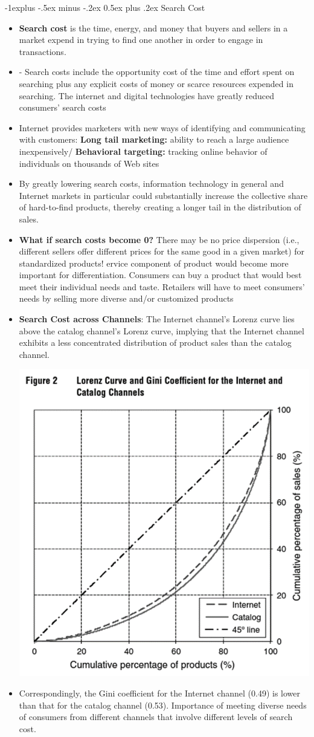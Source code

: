 \documentclass[12pt, landscape]{article}
\makeatletter
\renewcommand{\subsection}{\@startsection{subsection}{2}{0mm}%
                                {-1explus -.5ex minus -.2ex}%
                                {0.5ex plus .2ex}%
                                {\normalfont\normalsize\bfseries}}
\makeatother
\begin{document}
\begin{multicols*}{3}
\subsection{Search Cost }
\begin{itemize}
\item \textbf{Search cost} is the time, energy, and money that buyers and sellers in a market expend in trying to find one another in order to engage in transactions.
\item - Search costs include the opportunity cost of the time and effort spent on searching plus any explicit costs of money or scarce resources expended in searching. The internet and digital technologies have greatly reduced consumers’ search costs
\item Internet provides marketers with new ways of identifying and communicating with customers: \textbf{Long tail marketing:} ability to reach a large audience inexpensively/ \textbf{Behavioral targeting:} tracking online behavior of individuals on thousands of Web sites
\item By greatly lowering search costs, information technology in general and Internet markets in particular could substantially increase the collective share of hard-to-find products, thereby creating a longer tail in the distribution of sales.
\item \textbf{What if search costs become 0?} There may be no price dispersion (i.e., different sellers offer different prices for the same good in a given market) for standardized products! ervice component of product would become more important for differentiation. Consumers can buy a product that would best meet their individual needs and taste. Retailers will have to meet consumers’ needs by selling more diverse and/or customized products
\item \textbf{Search Cost across Channels}: The Internet channel’s Lorenz curve lies above the catalog channel’s Lorenz curve, implying that the Internet channel exhibits a less concentrated distribution of product sales than the catalog channel. 
\centerline{\includegraphics[width = 0.3\linewidth]{searchGini}}
\item Correspondingly, the Gini coefficient for the Internet channel (0.49) is lower than that for the catalog channel (0.53). Importance of meeting diverse needs of consumers from different channels that involve different levels of search cost.
\end{itemize}



\end{multicols*}
\end{document}
